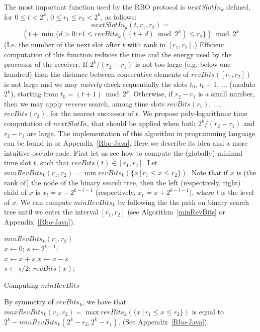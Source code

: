 \documentclass{llncs}
\begin{document}
The most important function used by the RBO protocol is $nextSlotIn_k$ defined,
for $0\le t<2^k$, $0\le r_1\le r_2<2^k$, as follows:
$$
nextSlotIn_k(t, r_1, r_2)=
$$
$$
\left(t+\min\{d>0 : r1\le revBits_k( (t+d)\bmod 2^k   ) \le r_2\}\right) \bmod 2^k 
$$
(I.e. the number of the next slot after $t$ with rank in $[r_1,r_2]$.)
Efficient computation of this function reduces the 
time and the energy used by the processor of the receiver.
If $2^k/(r_2-r_1)$ is not too large (e.g. below one hundred)
then the distance between consecutive elements of $revBits([r_1,r_2])$ 
is not large and we may {\em naively} check sequentially the slots $t_0$, $t_0+1$, $\ldots$ (modulo $2^k$), 
starting from $t_0=(t+1)\bmod 2^k$. 
Otherwise, if $r_2-r_1$ is a small number, then we may apply {\em reverse} search, 
among time slots $revBits(r_1)$, $\ldots$, $revBits(r_2)$, 
for the nearest successor of $t$.
We propose poly-logarithmic time computation 
of $nextSlotIn$, 
that should be applied when both
$2^k/(r_2-r_1)$ and $r_2-r_1$ are large.
The implementation of this algorithm in programming language can be found in \cite{RBO-WWW} or Appendix~\ref{Rbo-Java}.
Here we describe its idea and a more intuitive pseudo-code.
First let us see how to compute the (globally)  minimal time slot $t$,
such that $revBits(t)\in [r_1,r_2]$.
Let $minRevBits_k(r_1,r_2)=\min revBits_k(\{x\, |\, r_1\le x\le r_2\})$.
Note that if $x$ is (the rank of) the node of the binary search tree,
then the left (respectively, right) child of $x$ is $x_l=x-2^{k-l-1}$ 
(respectively, $x_r=x+2^{k-l-1}$), where $l$ is the
level of $x$.
We can compute $minRevBits_k$ %
by following the the path on binary search tree until
we enter the interval $[r_1,r_2]$ (see Algorithm~\ref{minRevBits} or Appendix~\ref{Rbo-Java}).
\begin{algorithm}
  \KwFunction $minRevBits_k( r_1, r_2 )$\\
  $x\gets 0$; $s\gets 2^{k-1}$;\\
      {
            {
              $x\gets x+s$
            }
            \lElse 
                {
                  $x\gets x-s$
                }\\
                $s\gets s/2$;
      }
      \KwReturn $revBits(x)$;
      \caption{Computing $minRevBits$\label{minRevBits}}
\end{algorithm}
By symmetry of $revBits_k$, we have 
that $maxRevBits_k(r_1,r_2)=\max revBits_k(\{x\, |\, r_1\le x\le r_2\})$ is equal to
$2^k-minRevBits_k(2^k-r_2, 2^k-r_1)$.
(See Appendix~\ref{Rbo-Java}).
\end{document}
